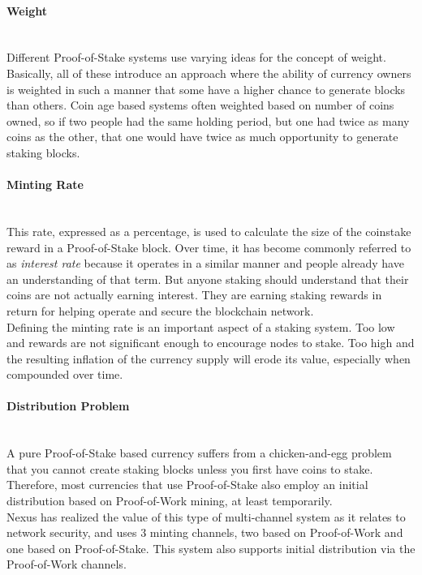 \documentclass[11pt]{article}
\begin{document}
\paragraph{Weight} ~\\
Different Proof-of-Stake systems use varying ideas for the concept of weight. Basically, all of these introduce an approach where the ability of currency owners is weighted in such a manner that some have a higher chance to generate blocks than others. Coin age based systems often weighted based on number of coins owned, so if two people had the same holding period, but one had twice as many coins as the other, that one would have twice as much opportunity to generate staking blocks.

\paragraph{Minting Rate} ~\\
This rate, expressed as a percentage, is used to calculate the size of the coinstake reward in a Proof-of-Stake block. Over time, it has become commonly referred to as \textit{interest rate} because it operates in a similar manner and people already have an understanding of that term. But anyone staking should understand that their coins are not actually earning interest. They are earning staking rewards in return for helping operate and secure the blockchain network.\\

\noindent Defining the minting rate is an important aspect of a staking system. Too low and rewards are not significant enough to encourage nodes to stake. Too high and the resulting inflation of the currency supply will erode its value, especially when compounded over time.

\paragraph{Distribution Problem} ~\\
A pure Proof-of-Stake based currency suffers from a chicken-and-egg problem that you cannot create staking blocks unless you first have coins to stake. Therefore, most currencies that use Proof-of-Stake also employ an initial distribution based on Proof-of-Work mining, at least temporarily.\\

\noindent Nexus has realized the value of this type of multi-channel system as it relates to network security, and uses 3 minting channels, two based on Proof-of-Work and one based on Proof-of-Stake. This system also supports initial distribution via the Proof-of-Work channels.
\end{document}
